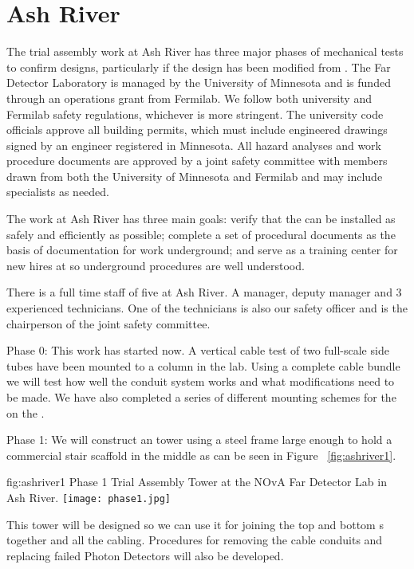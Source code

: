\section{Ash River}

The trial assembly work at Ash River has three major phases of
 mechanical tests to confirm designs, particularly if the
design has been modified from .  The  Far
Detector Laboratory is managed by the University of Minnesota and is
funded through an operations grant from Fermilab.  We follow both
university and Fermilab safety regulations, whichever is more
stringent.  The university code officials approve all building
permits, which must include engineered drawings signed by an engineer
registered in Minnesota. All hazard analyses and work procedure
documents are approved by a joint safety committee with members drawn
from both the University of Minnesota and Fermilab and may include
specialists as needed.

The work at Ash River has three main goals: verify that the
  can be installed as safely and efficiently as
possible; complete a set of procedural documents as the basis of
documentation for work underground; and serve as a training center for
new hires at \surf so underground procedures are well understood.

There is a full time staff of five  at Ash River. A manager,
deputy manager and 3 experienced technicians.  One of the technicians
is also our safety officer and is the chairperson of the joint safety
committee.


Phase 0: This work has started now.  A vertical cable test of two
full-scale  side tubes have been mounted to a column in the
lab. Using a complete cable bundle we will test how well the conduit
system works and what modifications need to be made. We have also
completed a series of different mounting schemes for the 
on the .

Phase 1: We will construct an  tower using a steel frame large
enough to hold a commercial stair scaffold in the middle as can be
seen in Figure ~\ref{fig:ashriver1}.
\begin{dunefigure}{fig:ashriver1}
  {Phase 1 Trial Assembly  Tower at the NOvA Far Detector Lab in Ash River.}
  \texttt{[image: phase1.jpg]}
\end{dunefigure}
This  tower will be designed so we can
use it for joining the top and bottom s together and all the
cabling. Procedures for removing the cable conduits and replacing
failed Photon Detectors will also be developed.

